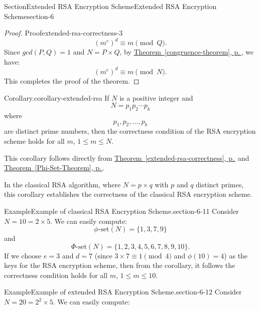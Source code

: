 \documentclass[oneside,12pt,]{article}
\newcommand{\xreffont}{\relax}
\numberwithin{equation}{section}
\begin{document}
\begin{sectionptx}{Section}{Extended RSA Encryption Scheme}{}{Extended RSA Encryption Scheme}{}{}{section-6}
\begin{proof}{Proof}{}{extended-rsa-correctness-3}
\begin{equation*}
(m^e)^d \equiv m \pmod{Q}\text{.}
\end{equation*}
Since \(gcd(P,Q) = 1\) and \(N = P \times Q\), by \hyperref[congruence-theorem]{Theorem~{\xreffont\ref{congruence-theorem}}, p.\,\pageref{congruence-theorem}}, we have:%
\begin{equation*}
(m^e)^d \equiv m \pmod{N}\text{.}
\end{equation*}
This completes the proof of the theorem.%
\end{proof}
\begin{corollary}{Corollary}{.}{}{corollary-extended-rsa}%
If \(N\) is a positive integer and%
\begin{equation*}
N = p_1 p_2 \cdots p_k
\end{equation*}
where%
\begin{equation*}
p_1, p_2, \ldots, p_k
\end{equation*}
are distinct prime numbers, then the correctness condition of the RSA encryption scheme holds for all \(m\), \(1 \leq m \leq N\).%
\end{corollary}
This corollary follows directly from \hyperref[extended-rsa-correctness]{Theorem~{\xreffont\ref{extended-rsa-correctness}}, p.\,\pageref{extended-rsa-correctness}} and \hyperref[Phi-Set-Theorem]{Theorem~{\xreffont\ref{Phi-Set-Theorem}}, p.\,\pageref{Phi-Set-Theorem}}.%
\par
In the classical RSA algorithm, where \(N = p \times q\) with \(p\) and \(q\) distinct primes, this corollary establishes the correctness of the classical RSA encryption scheme.%
\begin{example}{Example}{Example of classical RSA Encryption Scheme.}{section-6-11}%
Consider \(N = 10 = 2 \times 5\). We can easily compute:%
\begin{equation*}
\phi\text{-set}(N) = \{1,3,7,9\}
\end{equation*}
and%
\begin{equation*}
\Phi\text{-set}(N) = \{1,2,3,4,5,6,7,8,9,10\}\text{.}
\end{equation*}
If we choose \(e = 3\) and \(d = 7\) (since \(3 \times 7 \equiv 1 \pmod{4}\) and \(\phi(10) = 4\)) as the keys for the RSA encryption scheme, then from the corollary, it follows the correctness condition holds for all \(m\), \(1 \leq m \leq 10\).%
\end{example}
\begin{example}{Example}{Example of extended RSA Encryption Scheme.}{section-6-12}%
Consider \(N = 20 = 2^2 \times 5 \). We can easily compute:%
\begin{equation*}

\end{equation*}
\end{example}
\end{sectionptx}
\end{document}
